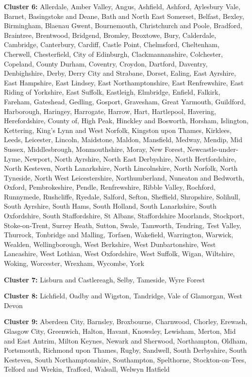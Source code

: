 \documentclass[]{interact}
\theoremstyle{plain}%
\theoremstyle{definition}
\theoremstyle{remark}
\begin{document}
\textbf{Cluster 6: } Allerdale, Amber Valley, Angus, Ashfield, Ashford,
Aylesbury Vale, Barnet, Basingstoke and Deane, Bath and North East
Somerset, Belfast, Bexley, Birmingham, Blaenau Gwent, Bournemouth,
Christchurch and Poole, Bradford, Braintree, Brentwood, Bridgend,
Bromley, Broxtowe, Bury, Calderdale, Cambridge, Canterbury, Cardiff,
Castle Point, Chelmsford, Cheltenham, Cherwell, Chesterfield, City of
Edinburgh, Clackmannanshire, Colchester, Copeland, County Durham,
Coventry, Croydon, Dartford, Daventry, Denbighshire, Derby, Derry City
and Strabane, Dorset, Ealing, East Ayrshire, East Hampshire, East
Lindsey, East Northamptonshire, East Renfrewshire, East Riding of
Yorkshire, East Suffolk, Eastleigh, Elmbridge, Enfield, Falkirk,
Fareham, Gateshead, Gedling, Gosport, Gravesham, Great Yarmouth,
Guildford, Harborough, Haringey, Harrogate, Harrow, Hart, Hartlepool,
Havering, Herefordshire, County of, High Peak, Hinckley and Bosworth,
Horsham, Islington, Kettering, King's Lynn and West Norfolk, Kingston
upon Thames, Kirklees, Leeds, Leicester, Lincoln, Maidstone, Maldon,
Mansfield, Medway, Mendip, Mid Sussex, Middlesbrough, Monmouthshire,
Moray, New Forest, Newcastle-under-Lyme, Newport, North Ayrshire, North
East Derbyshire, North Hertfordshire, North Kesteven, North Lanarkshire,
North Lincolnshire, North Norfolk, North Tyneside, North West
Leicestershire, Northumberland, Nuneaton and Bedworth, Oxford,
Pembrokeshire, Pendle, Renfrewshire, Ribble Valley, Rochford, Runnymede,
Rushcliffe, Ryedale, Salford, Sefton, Sheffield, Shropshire, Solihull,
South Ayrshire, South Hams, South Holland, South Lanarkshire, South
Oxfordshire, South Staffordshire, St Albans, Staffordshire Moorlands,
Stockport, Stoke-on-Trent, Surrey Heath, Sutton, Swale, Tamworth,
Tendring, Test Valley, Thurrock, Tonbridge and Malling, Torfaen,
Wakefield, Warrington, Warwick, Wealden, Wellingborough, West Berkshire,
West Dunbartonshire, West Lancashire, West Lothian, West Oxfordshire,
West Suffolk, Wigan, Wiltshire, Woking, Worcester, Wrexham, Wycombe,
York

\textbf{Cluster 7: } Lisburn and Castlereagh, Selby, Tameside, Wyre
Forest

\textbf{Cluster 8: } Lichfield, Oadby and Wigston, Tandridge, Vale of
Glamorgan, West Devon

\textbf{Cluster 9: } Aberdeen City, Barnsley, Broxbourne, Charnwood,
Chorley, Erewash, Glasgow City, Greenwich, Halton, Havant, Knowsley,
Lewisham, Merton, Mid and East Antrim, Milton Keynes, Newark and
Sherwood, Northampton, Oldham, Portsmouth, Richmond upon Thames, Rugby,
Sandwell, South Derbyshire, South Kesteven, South Northamptonshire,
Southampton, Spelthorne, Stockton-on-Tees, Telford and Wrekin, Trafford,
Walsall, Welwyn Hatfield
\end{document}

